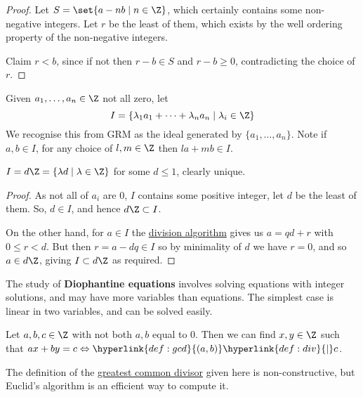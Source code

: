 \documentclass{article}
\begin{document}
\begin{proof}
    Let $S = \set{a - n b \mid n \in \Z}$, which certainly contains some non-negative integers.
    Let $r$ be the least of them, which exists by the well ordering property of the non-negative integers.

    Claim $r < b$, since if not then $r - b \in S$ and $r - b \geq 0$, contradicting the choice of $r$.
\end{proof}


Given $a_1, \dots, a_n \in \Z$ not all zero, let
\begin{equation*}
    I = \{\lambda_1 a_1 + \dots + \lambda_n a_n \mid \lambda_i \in \Z\}
\end{equation*}
We recognise this from GRM as the ideal generated by $\{a_1, \dots, a_n\}$.
Note if $a, b \in I$, for any choice of $l, m \in \Z$ then $l a + m b \in I$.

\begin{nlemma}\label{lem:1.1}
    $I = d \Z = \{\lambda d \mid \lambda \in \Z\}$ for some $d \leq 1$, clearly unique.
\end{nlemma}

\begin{proof}
    As not all of $a_i$ are $0$, $I$ contains some positive integer, let $d$ be the least of them.  So, $d \in I$, and hence $d \Z \subset I$.

    On the other hand, for $a \in I$ the \hyperlink{def:divisionAlg}{division algorithm} gives us $a = qd + r$ with $0 \leq r < d$.
    But then $r = a - dq \in I$ so by minimality of $d$ we have $r = 0$, and so $a \in d \Z$, giving $I \subset d \Z$ as required.
\end{proof}


The study of \textbf{Diophantine equations} involves solving equations with integer solutions, and may have more variables than equations.
The simplest case is linear in two variables, and can be solved easily.
\begin{cor}
    Let $a, b, c \in \Z$ with not both $a, b$ equal to $0$.
    Then we can find $x, y \in \Z$ such that $a x + by = c \Leftrightarrow \hyperlink{def:gcd}{(a, b)} \hyperlink{def:div}{\mid} c$.
\end{cor}
The definition of the \hyperlink{def:gcd}{greatest common divisor} given here is non-constructive, but Euclid's algorithm is an efficient way to compute it.
\end{document}

